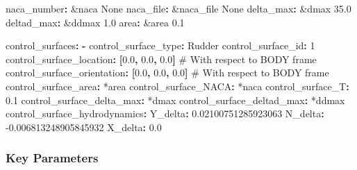 \documentclass[
  letterpaper,
  DIV=11,
  numbers=noendperiod]{scrreprt}
\newenvironment{Shaded}{\begin{snugshade}}{\end{snugshade}}
\newcommand{\AttributeTok}[1]{\textcolor[rgb]{0.40,0.45,0.13}{#1}}
\newcommand{\CommentTok}[1]{\textcolor[rgb]{0.37,0.37,0.37}{#1}}
\newcommand{\DecValTok}[1]{\textcolor[rgb]{0.68,0.00,0.00}{#1}}
\newcommand{\FloatTok}[1]{\textcolor[rgb]{0.68,0.00,0.00}{#1}}
\newcommand{\FunctionTok}[1]{\textcolor[rgb]{0.28,0.35,0.67}{#1}}
\newcommand{\KeywordTok}[1]{\textcolor[rgb]{0.00,0.23,0.31}{\textbf{#1}}}
\newcommand{\OtherTok}[1]{\textcolor[rgb]{0.00,0.23,0.31}{#1}}
\begin{document}
\begin{Shaded}
\begin{Highlighting}[]
\FunctionTok{naca\_number}\KeywordTok{:}\AttributeTok{ }\OtherTok{\&naca}\AttributeTok{ None}
\FunctionTok{naca\_file}\KeywordTok{:}\AttributeTok{ }\OtherTok{\&naca\_file}\AttributeTok{ None}
\FunctionTok{delta\_max}\KeywordTok{:}\AttributeTok{ }\OtherTok{\&dmax}\AttributeTok{ 35.0}
\FunctionTok{deltad\_max}\KeywordTok{:}\AttributeTok{ }\OtherTok{\&ddmax}\AttributeTok{ 1.0}
\FunctionTok{area}\KeywordTok{:}\AttributeTok{ }\OtherTok{\&area}\AttributeTok{ 0.1 }

\FunctionTok{control\_surfaces}\KeywordTok{:}
\AttributeTok{  }\KeywordTok{{-}}\AttributeTok{ }
\AttributeTok{    }\FunctionTok{control\_surface\_type}\KeywordTok{:}\AttributeTok{ Rudder}
\AttributeTok{    }\FunctionTok{control\_surface\_id}\KeywordTok{:}\AttributeTok{ }\DecValTok{1}
\AttributeTok{    }\FunctionTok{control\_surface\_location}\KeywordTok{:}\AttributeTok{ }\KeywordTok{[}\FloatTok{0.0}\KeywordTok{,}\AttributeTok{ }\FloatTok{0.0}\KeywordTok{,}\AttributeTok{ }\FloatTok{0.0}\KeywordTok{]}\CommentTok{    \# With respect to BODY frame}
\AttributeTok{    }\FunctionTok{control\_surface\_orientation}\KeywordTok{:}\AttributeTok{ }\KeywordTok{[}\FloatTok{0.0}\KeywordTok{,}\AttributeTok{ }\FloatTok{0.0}\KeywordTok{,}\AttributeTok{ }\FloatTok{0.0}\KeywordTok{]}\CommentTok{  \# With respect to BODY frame}
\AttributeTok{    }\FunctionTok{control\_surface\_area}\KeywordTok{:}\AttributeTok{ }\OtherTok{*area}
\AttributeTok{    }\FunctionTok{control\_surface\_NACA}\KeywordTok{:}\AttributeTok{ }\OtherTok{*naca}
\AttributeTok{    }\FunctionTok{control\_surface\_T}\KeywordTok{:}\AttributeTok{ }\FloatTok{0.1}
\AttributeTok{    }\FunctionTok{control\_surface\_delta\_max}\KeywordTok{:}\AttributeTok{ }\OtherTok{*dmax}
\AttributeTok{    }\FunctionTok{control\_surface\_deltad\_max}\KeywordTok{:}\AttributeTok{ }\OtherTok{*ddmax}
\AttributeTok{    }\FunctionTok{control\_surface\_hydrodynamics}\KeywordTok{:}
\AttributeTok{      }\FunctionTok{Y\_delta}\KeywordTok{:}\AttributeTok{ }\FloatTok{0.02100751285923063}
\AttributeTok{      }\FunctionTok{N\_delta}\KeywordTok{:}\AttributeTok{ }\FloatTok{{-}0.006813248905845932}
\AttributeTok{      }\FunctionTok{X\_delta}\KeywordTok{:}\AttributeTok{ }\FloatTok{0.0}
\end{Highlighting}
\end{Shaded}

\subsubsection*{Key Parameters}\label{key-parameters-4}
\end{document}
